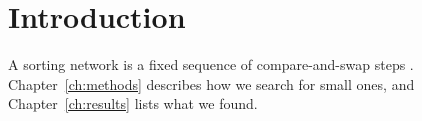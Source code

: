 \chapter{Introduction}\label{ch:intro}
A sorting network is a fixed sequence of compare-and-swap steps \citep{knuth1998}.
Chapter~\ref{ch:methods} describes how we search for small ones, and
Chapter~\ref{ch:results} lists what we found.
